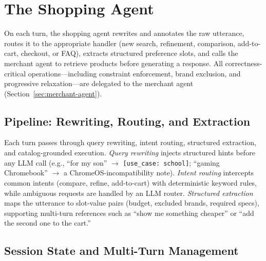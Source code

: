 \documentclass[sigconf,anonymous]{acmart}
\begin{document}

\section{The Shopping Agent}
\label{sec:shopping-agent}

On each turn, the shopping agent rewrites and annotates the raw utterance,
routes it to the appropriate handler (new search, refinement, comparison,
add-to-cart, checkout, or FAQ), extracts structured preference slots, and
calls the merchant agent to retrieve products before generating a response.
All correctness-critical operations---including constraint enforcement, brand
exclusion, and progressive relaxation---are delegated to the merchant agent
(Section~\ref{sec:merchant-agent}).

\subsection{Pipeline: Rewriting, Routing, and Extraction}

Each turn passes through query rewriting, intent routing, structured extraction,
and catalog-grounded execution.
\emph{Query rewriting} injects structured hints before any LLM call
(e.g., ``for my son'' $\to$ \texttt{[use\_case:~school]};
``gaming Chromebook'' $\to$ a ChromeOS-incompatibility note).
\emph{Intent routing} intercepts common intents (compare, refine, add-to-cart)
with deterministic keyword rules, while ambiguous requests are handled by an
LLM router.
\emph{Structured extraction} maps the utterance to slot-value pairs (budget,
excluded brands, required specs), supporting multi-turn references such as
``show me something cheaper'' or ``add the second one to the cart.''

\subsection{Session State and Multi-Turn Management}
\end{document}
